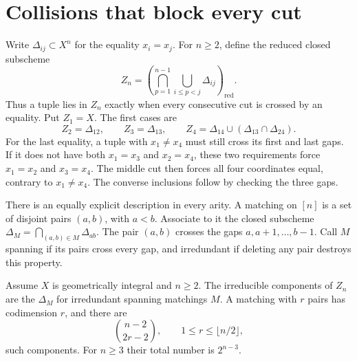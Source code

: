 \section{Collisions that block every cut}
\label{v4-sec:word-collision-supports}

Write \(\Delta_{ij}\subset X^n\) for the equality \(x_i=x_j\).
For \(n\ge2\), define the reduced closed subscheme
\begin{equation}\label{v4-eq:word-collision-support}
 Z_n=
 \left(\bigcap_{p=1}^{n-1}
               \bigcup_{i\le p<j}\Delta_{ij}\right)_{\mathrm{red}}.
\end{equation}
Thus a tuple lies in \(Z_n\) exactly when every consecutive cut
is crossed by an equality. Put \(Z_1=X\). The first cases are
\begin{equation}\label{v4-eq:word-first-supports}
 Z_2=\Delta_{12},\qquad Z_3=\Delta_{13},\qquad
 Z_4=\Delta_{14}\cup(\Delta_{13}\cap\Delta_{24}).
\end{equation}
For the last equality, a tuple with \(x_1\ne x_4\) must still
cross its first and last gaps. If it does not have both
\(x_1=x_3\) and \(x_2=x_4\), these two requirements force
\(x_1=x_2\) and \(x_3=x_4\). The middle cut then forces all
four coordinates equal, contrary to \(x_1\ne x_4\).
The converse inclusions follow by checking the three gaps.

There is an equally explicit description in every arity. A matching
on \([n]\) is a set of disjoint pairs \((a,b)\), with \(a<b\).
Associate to it the closed subscheme
\(\Delta_M=\bigcap_{(a,b)\in M}\Delta_{ab}\).
The pair \((a,b)\) crosses the gaps \(a,a+1,\ldots,b-1\).
Call \(M\) spanning if its pairs cross every gap, and irredundant
if deleting any pair destroys this property.

\begin{theorem}
\label{v4-thm:word-support-components}
Assume \(X\) is geometrically integral and \(n\ge2\). The irreducible components
of \(Z_n\) are the \(\Delta_M\) for irredundant spanning
matchings \(M\). A matching with \(r\) pairs has codimension \(r\),
and there are
\[
 \binom{n-2}{2r-2},\qquad 1\le r\le\lfloor n/2\rfloor,
\]
such components. For \(n\ge3\) their total number is \(2^{n-3}\).
\end{theorem}

